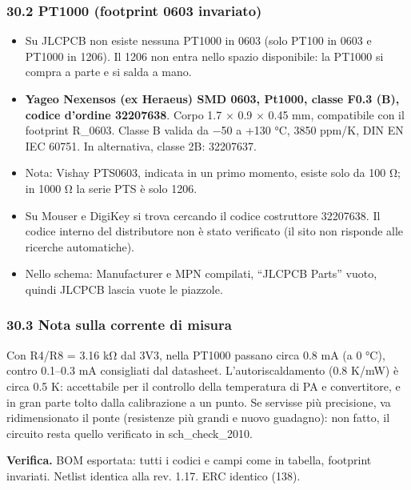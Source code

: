 \subsubsection[30.2 PT1000 (footprint 0603 invariato)]{30.2 PT1000 (footprint 0603 invariato)}

\begin{itemize}
\item Su JLCPCB non esiste nessuna PT1000 in 0603 (solo PT100 in 0603 e PT1000 in 1206). Il 1206 non entra nello spazio disponibile: la PT1000 si compra a parte e si salda a mano.
\item \textbf{Yageo Nexensos (ex Heraeus) SMD 0603, Pt1000, classe F0.3 (B), codice d'ordine 32207638}. Corpo 1.7 × 0.9 × 0.45 mm, compatibile con il footprint R\_\allowbreak{}0603. Classe B valida da −50 a +130 °C, 3850 ppm/\allowbreak{}K, DIN EN IEC 60751. In alternativa, classe 2B: 32207637.
\item Nota: Vishay PTS0603, indicata in un primo momento, esiste solo da 100 Ω; in 1000 Ω la serie PTS è solo 1206.
\item Su Mouser e DigiKey si trova cercando il codice costruttore 32207638. Il codice interno del distributore non è stato verificato (il sito non risponde alle ricerche automatiche).
\item Nello schema: Manufacturer e MPN compilati, \textquotedblleft{}JLCPCB Parts\textquotedblright{} vuoto, quindi JLCPCB lascia vuote le piazzole.
\end{itemize}

\subsubsection[30.3 Nota sulla corrente di misura]{30.3 Nota sulla corrente di misura}

Con R4/\allowbreak{}R8 = 3.16 kΩ dal 3V3, nella PT1000 passano circa 0.8 mA (a 0 °C), contro 0.1–0.3 mA consigliati dal datasheet. L'autoriscaldamento (0.8 K/\allowbreak{}mW) è circa 0.5 K: accettabile per il controllo della temperatura di PA e convertitore, e in gran parte tolto dalla calibrazione a un punto. Se servisse più precisione, va ridimensionato il ponte (resistenze più grandi e nuovo guadagno): non fatto, il circuito resta quello verificato in sch\_\allowbreak{}check\_\allowbreak{}2010.

\textbf{Verifica.} BOM esportata: tutti i codici e campi come in tabella, footprint invariati. Netlist identica alla rev. 1.17. ERC identico (138).
